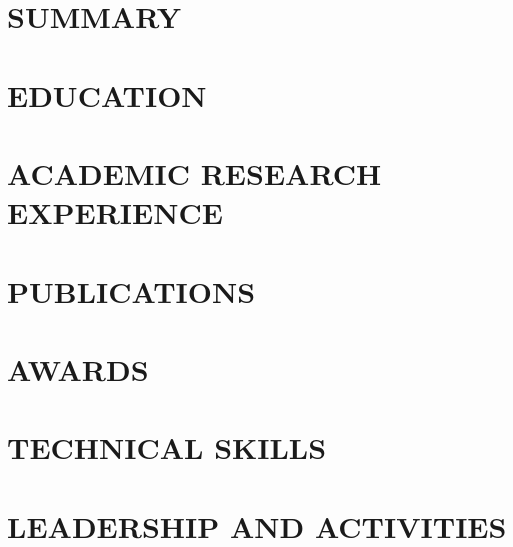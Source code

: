 \documentclass[letter,10pt]{article}
\begin{document}
\section{SUMMARY}


\section{EDUCATION}


\section{ACADEMIC RESEARCH EXPERIENCE}


\newpage

\section{PUBLICATIONS}


\section{AWARDS}


\section{TECHNICAL SKILLS}


\section{LEADERSHIP AND ACTIVITIES}

\end{document}
